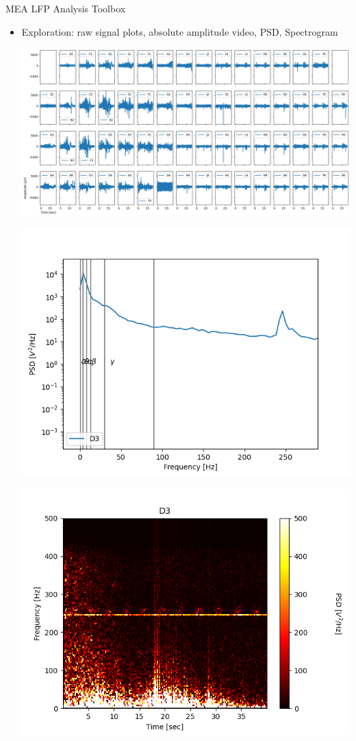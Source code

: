 \documentclass[10pt]{beamer}
\begin{document}
\begin{frame}[allowframebreaks]{MEA LFP Analysis Toolbox}
\begin{itemize}
     \item Exploration: raw signal plots, absolute amplitude video, PSD, Spectrogram \\ [1em]
      \begin{center}
        \includegraphics[keepaspectratio,width=0.9\framewidth]{img/4_raw.png}
      \end{center}
      \framebreak
      \begin{center}
        \includegraphics[keepaspectratio,width=0.8\framewidth]{img/4_psd.png}
      \end{center}
      \framebreak
      \begin{center}
        \includegraphics[keepaspectratio,width=0.8\framewidth]{img/4_spectrogram.png}

\end{center}
\end{itemize}
\end{frame}
\end{document}
